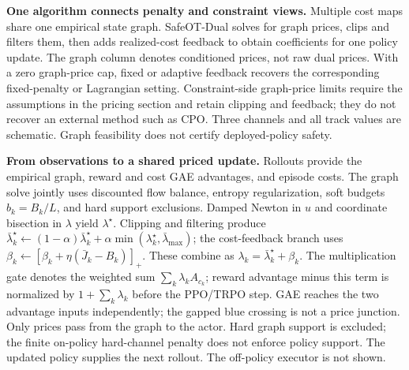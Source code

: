 \textbf{One algorithm connects penalty and constraint views.} Multiple cost maps
share one empirical state graph. SafeOT-Dual solves for graph prices, clips and
filters them, then adds realized-cost feedback to obtain coefficients for one
policy update. The graph column denotes conditioned prices, not raw dual prices.
With a zero graph-price cap, fixed or adaptive feedback recovers the corresponding
fixed-penalty or Lagrangian setting. Constraint-side graph-price limits require
the assumptions in the pricing section and retain clipping and feedback; they do
not recover an external method such as CPO. Three channels and all track values
are schematic. Graph feasibility does not certify deployed-policy safety.

\textbf{From observations to a shared priced update.} Rollouts provide the empirical
graph, reward and cost GAE advantages, and episode costs. The graph solve jointly
uses discounted flow balance, entropy regularization, soft budgets $b_k=B_k/L$,
and hard support exclusions. Damped Newton in $u$ and coordinate bisection in
$\lambda$ yield $\lambda^\star$. Clipping and filtering produce
$\bar\lambda^\star_k\leftarrow(1-\alpha)\bar\lambda^\star_k+
\alpha\min(\lambda^\star_k,\bar\lambda_{\max})$; the cost-feedback branch uses
$\beta_k\leftarrow[\beta_k+\eta(\bar J_k-B_k)]_+$. These combine as
$\lambda_k=\bar\lambda^\star_k+\beta_k$. The multiplication gate denotes the
weighted sum $\sum_k\lambda_k A_{c_k}$; reward advantage minus this term is
normalized by $1+\sum_k\lambda_k$ before the PPO/TRPO step. GAE reaches the two
advantage inputs independently; the gapped blue crossing is not a price junction.
Only prices pass from the graph to the actor. Hard graph support is excluded;
the finite on-policy hard-channel penalty does not enforce policy support. The
updated policy supplies the next rollout. The off-policy executor is not shown.
